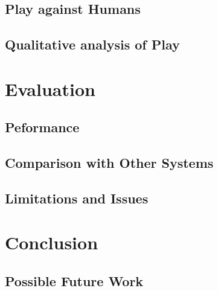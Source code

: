\documentclass[]{article}
\let\oldsection\section
\renewcommand\section{\clearpage\oldsection}
\begin{document}
\subsection{Play against Humans}
\subsection{Qualitative analysis of Play}

\section{Evaluation}
\subsection{Peformance}
\subsection{Comparison with Other Systems}
\subsection{Limitations and Issues}

\section{Conclusion}
\subsection{Possible Future Work}


\printbibliography
\end{document}
